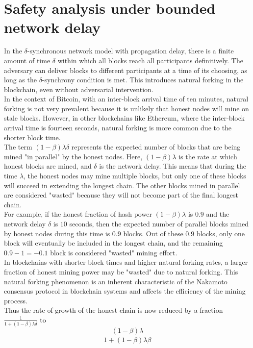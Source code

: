 \documentclass{report}
\begin{document}
\section{Safety analysis under bounded network delay}
In the $\delta$-synchronous network model with propagation delay, there is a finite amount of time $\delta$ within which all blocks reach all participants definitively. The adversary can deliver blocks to different participants at a time of its choosing, as long as the $\delta$-synchrony condition is met. This introduces natural forking in the blockchain, even without adversarial intervention.\\
In the context of Bitcoin, with an inter-block arrival time of ten minutes, natural forking is not very prevalent because it is unlikely that honest nodes will mine on stale blocks. However, in other blockchains like Ethereum, where the inter-block arrival time is fourteen seconds, natural forking is more common due to the shorter block time.\\
The term $(1 - \beta)\lambda\delta$ represents the expected number of blocks that are being mined "in parallel" by the honest nodes. Here, $(1 - \beta)\lambda$ is the rate at which honest blocks are mined, and $\delta$ is the network delay. This means that during the time $\lambda$, the honest nodes may mine multiple blocks, but only one of these blocks will succeed in extending the longest chain. The other blocks mined in parallel are considered "wasted" because they will not become part of the final longest chain.\\
For example, if the honest fraction of hash power $(1 - \beta)\lambda$ is $0.9$ and the network delay $\delta$ is $10$ seconds, then the expected number of parallel blocks mined by honest nodes during this time is $0.9$ blocks. Out of these $0.9$ blocks, only one block will eventually be included in the longest chain, and the remaining $0.9 - 1 = -0.1$ block is considered "wasted" mining effort.\\
In blockchains with shorter block times and higher natural forking rates, a larger fraction of honest mining power may be "wasted" due to natural forking. This natural forking phenomenon is an inherent characteristic of the Nakamoto consensus protocol in blockchain systems and affects the efficiency of the mining process.\\
Thus the rate of growth of the honest chain is now reduced by a fraction $\frac{1}{1+(1 - \beta)\lambda\delta}$ to
\begin{equation*}
	\frac{(1 - \beta) \lambda}{1 + (1 - \beta) \lambda \beta}
\end{equation*}
\end{document}
